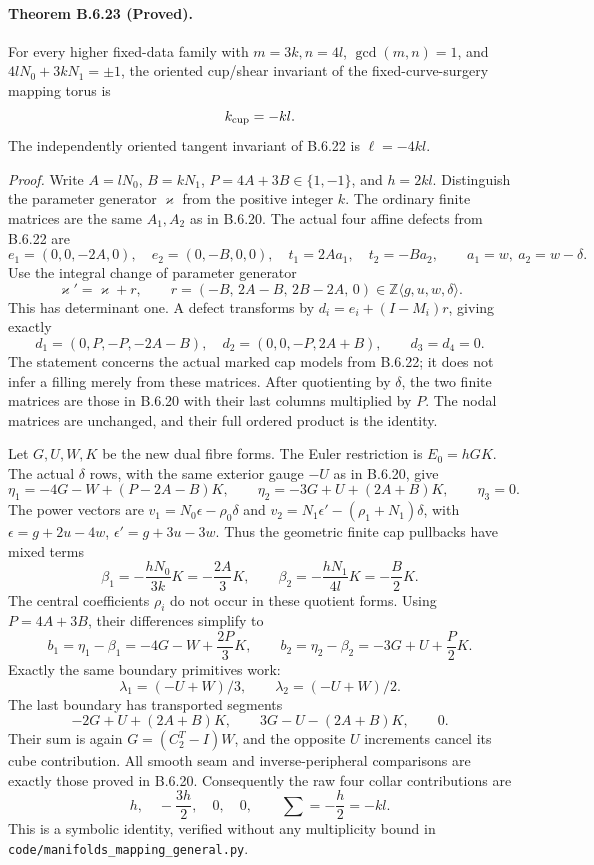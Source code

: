\paragraph{Theorem B.6.23 (Proved).}
For every higher fixed-data family with $m=3k,n=4l$,
$\gcd(m,n)=1$, and $4lN_0+3kN_1=\pm1$, the oriented cup/shear
invariant of the fixed-curve-surgery mapping torus is
\[
                         k_{\rm cup}=-kl.
\]
The independently oriented tangent invariant of B.6.22 is
$\ell=-4kl$.

\emph{Proof.} Write $A=lN_0$, $B=kN_1$, $P=4A+3B\in\{1,-1\}$,
and $h=2kl$. Distinguish the parameter generator $\varkappa$ from the
positive integer $k$. The ordinary finite matrices are the same $A_1,A_2$
as in B.6.20. The actual four affine defects from B.6.22 are
\[
 e_1=(0,0,-2A,0),\quad e_2=(0,-B,0,0),\quad
 t_1=2A a_1,\quad t_2=-B a_2,
 \qquad a_1=w,\ a_2=w-\delta.
\]
Use the integral change of parameter generator
\[
 \varkappa'=\varkappa+r,\qquad
 r=(-B,\,2A-B,\,2B-2A,\,0)\in\mathbb Z\langle g,u,w,\delta\rangle.
\]
This has determinant one. A defect transforms by
$d_i=e_i+(I-M_i)r$, giving exactly
\[
 d_1=(0,P,-P,-2A-B),\quad d_2=(0,0,-P,2A+B),\qquad
 d_3=d_4=0.
\]
The statement concerns the actual marked cap models from B.6.22;
it does not infer a filling merely from these matrices.
After quotienting by $\delta$, the two finite matrices are those in
B.6.20 with their last columns multiplied by $P$. The nodal matrices
are unchanged, and their full ordered product is the identity.

Let $G,U,W,K$ be the new dual fibre forms. The Euler restriction is
$E_0=hGK$. The actual $\delta$ rows, with the same exterior gauge $-U$
as in B.6.20, give
\[
 \eta_1=-4G-W+(P-2A-B)K,\qquad
 \eta_2=-3G+U+(2A+B)K,\qquad\eta_3=0.
\]
The power vectors are
$v_1=N_0\epsilon-\rho_0\delta$ and
$v_2=N_1\epsilon'-(\rho_1+N_1)\delta$, with
$\epsilon=g+2u-4w$, $\epsilon'=g+3u-3w$.
Thus the geometric finite cap pullbacks have mixed terms
\[
 \beta_1=-\frac{hN_0}{3k}K=-\frac{2A}{3}K,
 \qquad
 \beta_2=-\frac{hN_1}{4l}K=-\frac B2K.
\]
The central coefficients $\rho_i$ do not occur in these quotient forms.
Using $P=4A+3B$, their differences simplify to
\[
 b_1=\eta_1-\beta_1=-4G-W+\frac{2P}{3}K,
 \qquad
 b_2=\eta_2-\beta_2=-3G+U+\frac P2K.
\]
Exactly the same boundary primitives work:
\[
 \lambda_1=(-U+W)/3,\qquad\lambda_2=(-U+W)/2.
\]
The last boundary has transported segments
\[
 -2G+U+(2A+B)K,\qquad
 3G-U-(2A+B)K,\qquad0.
\]
Their sum is again $G=(C_2^T-I)W$, and the opposite $U$ increments
cancel its cube contribution. All smooth seam and inverse-peripheral
comparisons are exactly those proved in B.6.20. Consequently the raw
four collar contributions are
\[
                         h,\quad-\frac{3h}{2},\quad0,\quad0,
 \qquad \sum=-\frac h2=-kl.
\]
This is a symbolic identity, verified without any multiplicity bound in
\texttt{code/manifolds\_mapping\_general.py}.

